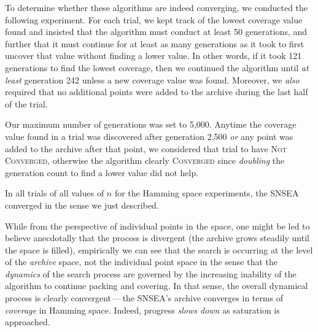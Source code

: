 \documentclass[twoside]{article}
\begin{document}
To determine whether these algorithms are indeed converging, we conducted the following experiment.  For each trial, we kept track of the lowest coverage value found and insisted that the algorithm must conduct at least 50 generations, and further that it must continue for at least as many generations as it took to first uncover that value without finding a lower value.  In other words, if it took 121 generations to find the lowest coverage, then we continued the algorithm until \emph{at least} generation 242 unless a new coverage value was found.  Moreover, we \emph{also} required that no additional points were added to the archive during the last half of the trial.

Our maximum number of generations was set to 5,000.  Anytime the coverage value found in a trial was discovered after generation 2,500 \emph{or} any point was added to the archive after that point, we considered that trial to have \textsc{Not Converged}, otherwise the algorithm clearly \textsc{Converged} since \emph{doubling} the generation count to find a lower value did not help.  

In all trials of all values of $n$  for the Hamming space experiments, the SNSEA converged in the sense we just described.

While from the perspective of individual points in the space, one might be led to believe anecdotally that the process is divergent (the archive grows steadily until the space is filled), empirically we can see that the search is occurring at the level of the \emph{archive} space, not the individual point space in the sense that the \emph{dynamics} of the search process are governed by the increasing inability of the algorithm to continue packing and covering.  In that sense, the overall dynamical process is clearly convergent\,---\,the SNSEA's archive converges in terms of \emph{coverage} in Hamming space.  Indeed, progress \emph{slows down} as saturation is approached.



\end{document}
